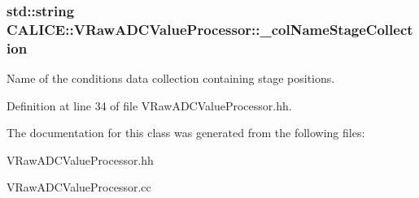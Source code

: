 \subsubsection[{\-\_\-col\-Name\-Stage\-Collection}]{\setlength{\rightskip}{0pt plus 5cm}std\-::string C\-A\-L\-I\-C\-E\-::\-V\-Raw\-A\-D\-C\-Value\-Processor\-::\-\_\-col\-Name\-Stage\-Collection\hspace{0.3cm}{\ttfamily [protected]}}\label{classCALICE_1_1VRawADCValueProcessor_a4af3c2f4f81070c495ea68090acb6386}


Name of the conditions data collection containing stage positions. 



Definition at line 34 of file V\-Raw\-A\-D\-C\-Value\-Processor.\-hh.



The documentation for this class was generated from the following files\-:\begin{DoxyCompactItemize}
\item 
V\-Raw\-A\-D\-C\-Value\-Processor.\-hh\item 
V\-Raw\-A\-D\-C\-Value\-Processor.\-cc\end{DoxyCompactItemize}
